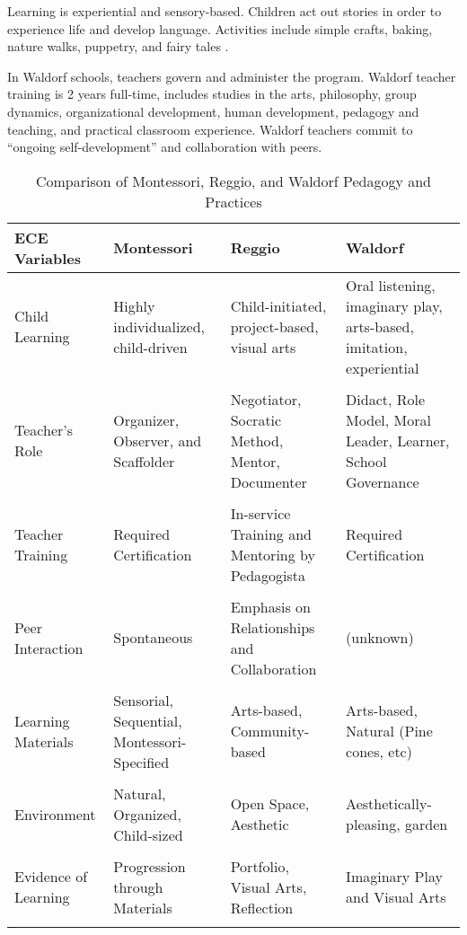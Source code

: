 \documentclass{article}
\theoremstyle{definition}
\theoremstyle{remark}
\begin{document}
Learning is experiential and sensory-based. Children act out stories in order to experience life and develop language. Activities include simple crafts, baking, nature walks, puppetry, and fairy tales \citep{Edwards_2002_ECRP}.

In Waldorf schools, teachers govern and administer the program. Waldorf teacher training is 2 years full-time, includes studies in the arts, philosophy, group dynamics, organizational development, human development, pedagogy and teaching, and practical classroom experience. Waldorf teachers commit to ``ongoing self-development'' and collaboration with peers. 

\pagebreak
\setlength{\tabcolsep}{12pt}
\begin{landscape}
\begin{center}
\thispagestyle{empty}
\begin{table}
\caption{Comparison of Montessori, Reggio, and Waldorf Pedagogy and Practices}
\label{tab:ecvars_1}
\small
\begin{tabular}{*4{>{\raggedright\arraybackslash}p{4.5cm}}}
\toprule
\textbf{ECE Variables} 	&	\textbf{Montessori}		&	\textbf{Reggio}		&	\textbf{Waldorf}		\\
\midrule
Child Learning	&	Highly individualized, child-driven	&	Child-initiated, project-based, visual arts  		&	Oral listening, imaginary play, arts-based, imitation, experiential 	\\ \\
Teacher's Role	&	Organizer, Observer, and Scaffolder	&	Negotiator, Socratic Method, Mentor, Documenter		&		Didact, Role Model, Moral Leader, Learner, School Governance	\\ \\
Teacher Training		&	Required Certification	&	In-service Training and Mentoring by Pedagogista		&	Required Certification	\\ \\
Peer Interaction	&	Spontaneous	&	Emphasis on Relationships and Collaboration		&	(unknown)		\\ \\
Learning Materials	&	Sensorial, Sequential, Montessori-Specified	&	Arts-based, Community-based	&	Arts-based, Natural (Pine cones, etc)	\\ \\
Environment	&	Natural, Organized, Child-sized		&	Open Space, Aesthetic		&	Aesthetically-pleasing, garden	\\ \\
Evidence of Learning	&	Progression through Materials	&	Portfolio, Visual Arts, Reflection	&	Imaginary Play and Visual Arts	\\ \\

\end{tabular}
\end{table}
\end{center}
\end{landscape}
\end{document}
